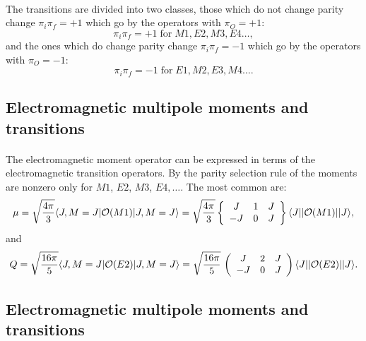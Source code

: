 \documentclass[%
twoside,                 %
final,                   %
10pt]{article}
\begin{document}
\paragraph{}
The transitions are divided into two classes, those
which do not change parity change $\pi _{i}\pi _{f}=+1$ which go by the
operators with $\pi _{O}=+1$:
\[
\pi _{i}\pi _{f}=+1 \; \mathrm{for} \; M1, E2, M3, E4 \dots,
\]
and the ones which do change parity change $\pi _{i}\pi _{f}=-1$
which go by the operators with $\pi _{O}=-1$:
\[
\pi _{i}\pi _{f}=-1 \; \mathrm{for} \; E1, M2, E3, M4 \dots.
\]



\subsection*{Electromagnetic multipole moments and transitions}

\paragraph{}
The 
electromagnetic moment operator can be expressed in terms of the
electromagnetic transition operators.
By the parity selection rule of the moments are nonzero
only for $M1$, $E2$, $M3$, $E4,\ldots$.
The most common are:
\[
\mu =\sqrt{\frac{4\pi }{3}}\langle J,M=J\vert {\cal O}(M1)\vert J,M=J\rangle= \sqrt{\frac{4\pi }{3}}\left\{\begin{array}{ccc} J & 1 &J \\  -J &  0 &  J \end{array}\right\}
\langle J\vert \vert {\cal O}(M1)\vert \vert J\rangle,
\]
and
\[
Q = \sqrt{\frac{16\pi }{5}}\langle J,M=J\vert {\cal O}(E2)\vert J,M=J\rangle= \sqrt{\frac{16\pi }{5}}\,
  \left(\begin{array}{ccc}  {J}&  {2} & {J}\\  {-J} & {0}&  {J}\end{array}\right)\langle J\vert\vert {\cal O}(E2)\vert\vert J\rangle.
\]



\subsection*{Electromagnetic multipole moments and transitions}

\end{document}

